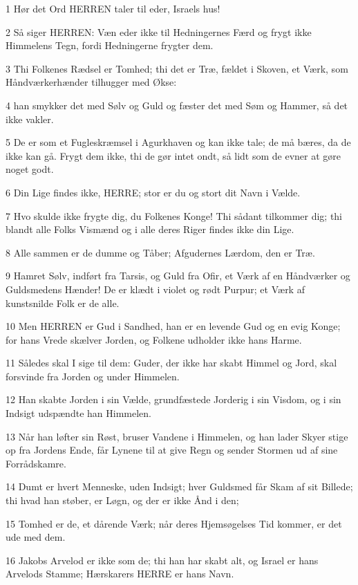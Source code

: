 \par 1 Hør det Ord HERREN taler til eder, Israels hus!
\par 2 Så siger HERREN: Væn eder ikke til Hedningernes Færd og frygt ikke Himmelens Tegn, fordi Hedningerne frygter dem.
\par 3 Thi Folkenes Rædsel er Tomhed; thi det er Træ, fældet i Skoven, et Værk, som Håndværkerhænder tilhugger med Økse:
\par 4 han smykker det med Sølv og Guld og fæster det med Søm og Hammer, så det ikke vakler.
\par 5 De er som et Fugleskræmsel i Agurkhaven og kan ikke tale; de må bæres, da de ikke kan gå. Frygt dem ikke, thi de gør intet ondt, så lidt som de evner at gøre noget godt.
\par 6 Din Lige findes ikke, HERRE; stor er du og stort dit Navn i Vælde.
\par 7 Hvo skulde ikke frygte dig, du Folkenes Konge! Thi sådant tilkommer dig; thi blandt alle Folks Vismænd og i alle deres Riger findes ikke din Lige.
\par 8 Alle sammen er de dumme og Tåber; Afgudernes Lærdom, den er Træ.
\par 9 Hamret Sølv, indført fra Tarsis, og Guld fra Ofir, et Værk af en Håndværker og Guldsmedens Hænder! De er klædt i violet og rødt Purpur; et Værk af kunstsnilde Folk er de alle.
\par 10 Men HERREN er Gud i Sandhed, han er en levende Gud og en evig Konge; for hans Vrede skælver Jorden, og Folkene udholder ikke hans Harme.
\par 11 Således skal I sige til dem: Guder, der ikke har skabt Himmel og Jord, skal forsvinde fra Jorden og under Himmelen.
\par 12 Han skabte Jorden i sin Vælde, grundfæstede Jorderig i sin Visdom, og i sin Indsigt udspændte han Himmelen.
\par 13 Når han løfter sin Røst, bruser Vandene i Himmelen, og han lader Skyer stige op fra Jordens Ende, får Lynene til at give Regn og sender Stormen ud af sine Forrådskamre.
\par 14 Dumt er hvert Menneske, uden Indsigt; hver Guldsmed får Skam af sit Billede; thi hvad han støber, er Løgn, og der er ikke Ånd i den;
\par 15 Tomhed er de, et dårende Værk; når deres Hjemsøgelses Tid kommer, er det ude med dem.
\par 16 Jakobs Arvelod er ikke som de; thi han har skabt alt, og Israel er hans Arvelods Stamme; Hærskarers HERRE er hans Navn.
